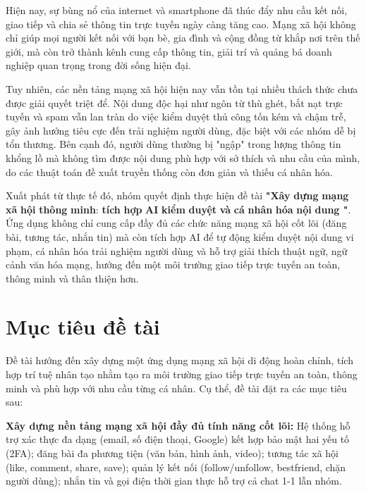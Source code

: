Hiện nay, sự bùng nổ của internet và smartphone đã thúc đẩy nhu cầu kết
nối, giao tiếp và chia sẻ thông tin trực tuyến ngày càng tăng cao. Mạng
xã hội không chỉ giúp mọi người kết nối với bạn bè, gia đình và cộng
đồng từ khắp nơi trên thế giới, mà còn trở thành kênh cung cấp thông
tin, giải trí và quảng bá doanh nghiệp quan trọng trong đời sống hiện
đại.

Tuy nhiên, các nền tảng mạng xã hội hiện nay vẫn tồn tại nhiều thách
thức chưa được giải quyết triệt để. Nội dung độc hại như ngôn từ thù
ghét, bắt nạt trực tuyến và spam vẫn lan tràn do việc kiểm duyệt thủ
công tốn kém và chậm trễ, gây ảnh hưởng tiêu cực đến trải nghiệm người
dùng, đặc biệt với các nhóm dễ bị tổn thương. Bên cạnh đó, người dùng
thường bị "ngập" trong lượng thông tin khổng lồ mà không tìm được nội
dung phù hợp với sở thích và nhu cầu của mình, do các thuật toán đề xuất
truyền thống còn đơn giản và thiếu cá nhân hóa.

Xuất phát từ thực tế đó, nhóm quyết định thực hiện đề tài \textbf{"Xây}
\textbf{dựng} \textbf{mạng} \textbf{xã} \textbf{hội} \textbf{thông}
\textbf{minh}: \textbf{tích} \textbf{hợp} \textbf{AI} \textbf{kiểm}
\textbf{duyệt} \textbf{và} \textbf{cá} \textbf{nhân} \textbf{hóa}
\textbf{nội} \textbf{dung "}. Ứng dụng không chỉ cung cấp đầy đủ các
chức năng mạng xã hội cốt lõi (đăng bài, tương tác, nhắn tin) mà còn
tích hợp AI để tự động kiểm duyệt nội dung vi phạm, cá nhân hóa trải
nghiệm người dùng và hỗ trợ giải thích thuật ngữ, ngữ cảnh văn hóa mạng,
hướng đến một môi trường
giao tiếp trực tuyến an toàn, thông minh và thân thiện hơn.

\section{Mục tiêu đề tài}\label{mux1ee5c-tiuxeau-ux111ux1ec1-tuxe0i}

Đề tài hướng đến xây dựng một ứng dụng mạng xã hội di động hoàn chỉnh,
tích hợp trí tuệ nhân tạo nhằm tạo ra môi trường giao tiếp trực tuyến an
toàn, thông minh và phù hợp với nhu cầu từng cá nhân. Cụ thể, đề tài đặt
ra các mục tiêu sau:

\textbf{Xây dựng nền tảng mạng xã hội đầy đủ tính năng cốt lõi:} Hệ
thống hỗ trợ xác thực đa dạng (email, số điện thoại, Google) kết hợp bảo
mật hai yếu tố (2FA); đăng bài đa phương tiện (văn bản, hình ảnh,
video); tương tác xã hội (like, comment, share, save); quản lý kết nối
(follow/unfollow, bestfriend, chặn người dùng); nhắn tin và gọi điện
thời gian thực hỗ trợ cả chat 1-1 lẫn nhóm.

